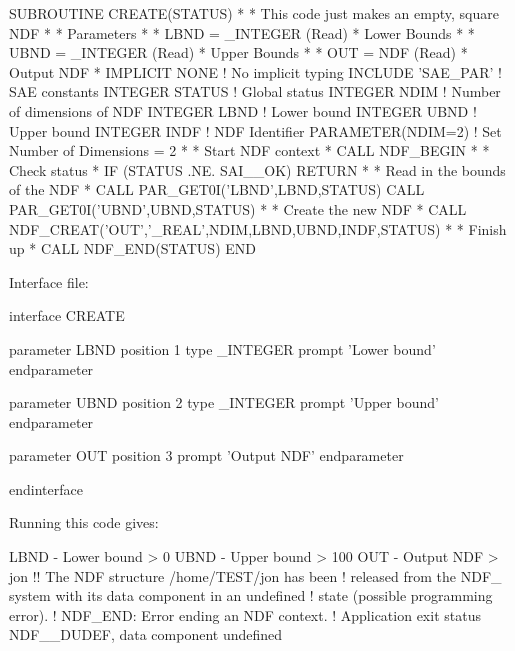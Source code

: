 \documentclass[11pt,nolof]{starlink}
\begin{document}
\begin{small}
\begin{terminalv}
       SUBROUTINE CREATE(STATUS)
*
* This code just makes an empty, square NDF
*
* Parameters
*
* LBND = _INTEGER (Read)
*  Lower Bounds
*
* UBND =  _INTEGER (Read)
*  Upper Bounds
*
* OUT = NDF (Read)
*  Output NDF
*
       IMPLICIT NONE     ! No implicit typing
       INCLUDE 'SAE_PAR' ! SAE constants
       INTEGER STATUS    ! Global status
       INTEGER NDIM      ! Number of dimensions of NDF
       INTEGER LBND      ! Lower bound
       INTEGER UBND      ! Upper bound
       INTEGER INDF      ! NDF Identifier
       PARAMETER(NDIM=2) ! Set Number of Dimensions = 2
*
* Start NDF context
*
       CALL NDF_BEGIN
*
* Check status
*
       IF (STATUS .NE. SAI__OK) RETURN
*
* Read in the bounds of the NDF
*
       CALL PAR_GET0I('LBND',LBND,STATUS)
       CALL PAR_GET0I('UBND',UBND,STATUS)
*
* Create the new NDF
*
       CALL NDF_CREAT('OUT','_REAL',NDIM,LBND,UBND,INDF,STATUS)
*
* Finish up
*
       CALL NDF_END(STATUS)
       END
\end{terminalv}
\end{small}

Interface file:

\begin{small}
\begin{terminalv}
interface CREATE

  parameter LBND
    position 1
    type _INTEGER
    prompt 'Lower bound'
  endparameter

  parameter UBND
    position 2
    type _INTEGER
    prompt 'Upper bound'
  endparameter

  parameter OUT
    position 3
    prompt 'Output NDF'
  endparameter

endinterface
\end{terminalv}
\end{small}

Running this code gives:

\begin{small}
\begin{terminalv}
LBND - Lower bound > 0
UBND - Upper bound > 100
OUT - Output NDF > jon
!! The NDF structure /home/TEST/jon has been
!     released from the NDF_ system with its data component in an undefined
!     state (possible programming error).
!  NDF_END: Error ending an NDF context.
!  Application exit status NDF__DUDEF, data component undefined
\end{terminalv}
\end{small}
\end{document}
